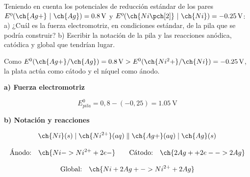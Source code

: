 \begin{exerciseEVAU}
    Teniendo en cuenta los potenciales de reducción estándar de los pares \( E\text{º}(\ch{Ag+}\ | \ \ch{Ag}) = \SI{+0.8}{\volt} \)  y \( E\text{º}(\ch{Ni\pch[2]}\ | \ \ch{Ni}) = \SI{-0.25}{\volt} \): a) ¿Cuál es la fuerza electromotriz, en condiciones estándar, de la pila que se podría construir? b) Escribir la notación de la pila y las reacciones anódica, catódica y global que tendrían lugar.

    \begin{solu}


        Como \(E^0(\ch{Ag+}/\ch{Ag}) = \SI{0.8}{\volt} > E^0(\ch{Ni^2+}/\ch{Ni}) = \SI{-0.25}{\volt}\), la plata actúa como cátodo y el níquel como ánodo.

        \textbf{a) Fuerza electromotriz}

        \begin{equation*}
            E^0_{pila} = 0,8-(-0,25) = \SI{1.05}{\volt}
        \end{equation*}

        \textbf{b) Notación y reacciones}

        \begin{equation*}
            \ch{Ni}(s) \mid \ch{Ni^{2+}}(aq) \parallel \ch{Ag+}(aq) \mid \ch{Ag}(s)
        \end{equation*}

        \begin{equation*}
            \text{Ánodo:} \quad \ch{Ni -> Ni^{2+} + 2 e-} \qquad \text{Cátodo:} \quad \ch{2 Ag+ + 2 e- -> 2 Ag}
        \end{equation*}

        \begin{equation*}
            \text{Global:} \quad \ch{Ni + 2 Ag+ -> Ni^{2+} + 2 Ag}
        \end{equation*}

    \end{solu}
\end{exerciseEVAU}

